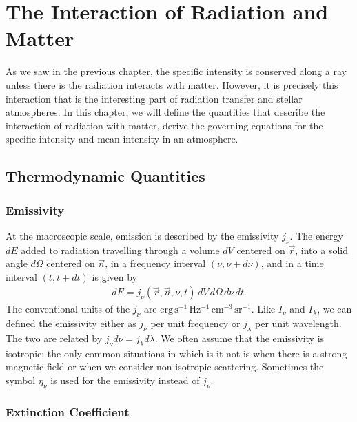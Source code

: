 \chapter{The Interaction of Radiation and Matter}
\label{chapter:interaction}

\noindent
As we saw in the previous chapter, 
the specific intensity is conserved along a
ray unless there is the radiation interacts with matter.
However, it is precisely this interaction that is the
interesting part of radiation transfer and stellar
atmospheres. In this chapter, we will define the quantities that 
describe the interaction of radiation with matter, derive the 
governing equations for the specific intensity and mean intensity 
in an atmosphere.

\newslide

\section{Thermodynamic Quantities}

\subsection{Emissivity}

At the macroscopic scale, emission is described by the emissivity
$j_\nu$. The energy $dE$ added to radiation travelling through a volume
$dV$ centered on $\vec r$, into a solid angle $d\Omega$ centered on
$\vec n$, in a frequency interval $(\nu,\nu+d\nu)$, and in a time
interval $(t,t+dt)$ is given by
\begin{align}
dE = j_\nu(\vec r, \vec n, \nu, t)\,dV\,d\Omega\,d\nu\,dt.
\end{align}
The conventional units of the $j_\nu$ are
$\mathrm{erg\,s^{-1}\,Hz^{-1}\,cm^{-3}\,sr^{-1}}$. 
Like $I_\nu$ and $I_\lambda$, we can defined the emissivity either as $j_\nu$ per unit frequency or $j_\lambda$ per unit wavelength. The two are related by
$j_\nu d\nu = j_\lambda d\lambda$.
We often assume that
the emissivity is isotropic; the only common situations in which is it
not is when there is a strong magnetic field or when we consider
non-isotropic scattering.
Sometimes the symbol $\eta_\nu$
is used for the emissivity instead of $j_\nu$. 

\newslide

\subsection{Extinction Coefficient}

